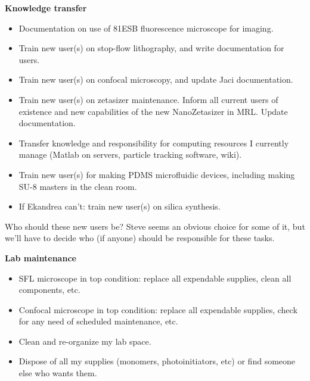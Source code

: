 \documentclass[11pt]{article}
\begin{document}
\textbf{Knowledge transfer}
\begin{itemize}

\item Documentation on use of 81ESB fluorescence microscope for imaging.

\item Train new user(s) on stop-flow lithography, and write documentation for users.

\item Train new user(s) on confocal microscopy, and update Jaci documentation.

\item Train new user(s) on zetasizer maintenance.  Inform all current users of existence and new capabilities of the new NanoZetasizer in MRL.  Update documentation.

\item Transfer knowledge and responsibility for computing resources I currently manage (Matlab on servers, particle tracking software, wiki).

\item Train new user(s) for making PDMS microfluidic devices, including making SU-8 masters in the clean room.

\item If Ekandrea can't: train new user(s) on silica synthesis.

\end{itemize}

Who should these new users be?  Steve seems an obvious choice for some of it, but we'll have to decide who (if anyone) should be responsible for these tasks.

\textbf{Lab maintenance}
\begin{itemize}

\item SFL microscope in top condition: replace all expendable supplies, clean all components, etc.

\item Confocal microscope in top condition: replace all expendable supplies, check for any need of scheduled maintenance, etc.

\item Clean and re-organize my lab space.

\item Dispose of all my supplies (monomers, photoinitiators, etc) or find someone else who wants them.

\end{itemize}
\end{document}
